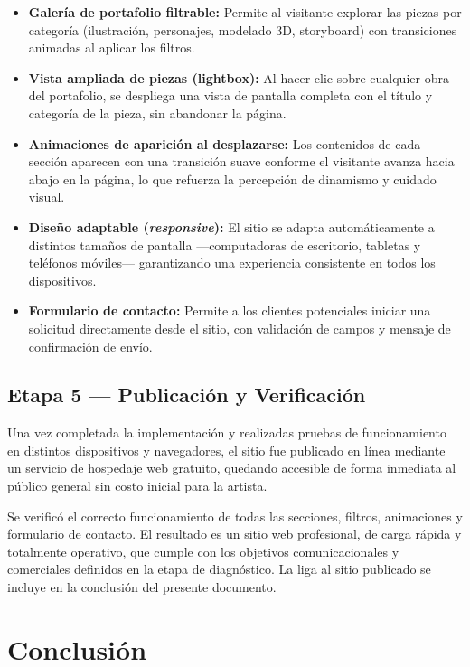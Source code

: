 \documentclass[12pt, letterpaper]{article}
\begin{document}
\begin{itemize}
  \item \textbf{Galería de portafolio filtrable:} Permite al visitante explorar las piezas por categoría (ilustración, personajes, modelado 3D, storyboard) con transiciones animadas al aplicar los filtros.
  \item \textbf{Vista ampliada de piezas (lightbox):} Al hacer clic sobre cualquier obra del portafolio, se despliega una vista de pantalla completa con el título y categoría de la pieza, sin abandonar la página.
  \item \textbf{Animaciones de aparición al desplazarse:} Los contenidos de cada sección aparecen con una transición suave conforme el visitante avanza hacia abajo en la página, lo que refuerza la percepción de dinamismo y cuidado visual.
  \item \textbf{Diseño adaptable (\textit{responsive}):} El sitio se adapta automáticamente a distintos tamaños de pantalla —computadoras de escritorio, tabletas y teléfonos móviles— garantizando una experiencia consistente en todos los dispositivos.
  \item \textbf{Formulario de contacto:} Permite a los clientes potenciales iniciar una solicitud directamente desde el sitio, con validación de campos y mensaje de confirmación de envío.
\end{itemize}

\subsection{Etapa 5 — Publicación y Verificación}

Una vez completada la implementación y realizadas pruebas de funcionamiento en distintos dispositivos y navegadores, el sitio fue publicado en línea mediante un servicio de hospedaje web gratuito, quedando accesible de forma inmediata al público general sin costo inicial para la artista.

Se verificó el correcto funcionamiento de todas las secciones, filtros, animaciones y formulario de contacto. El resultado es un sitio web profesional, de carga rápida y totalmente operativo, que cumple con los objetivos comunicacionales y comerciales definidos en la etapa de diagnóstico. La liga al sitio publicado se incluye en la conclusión del presente documento.

\section{Conclusión}
\end{document}
